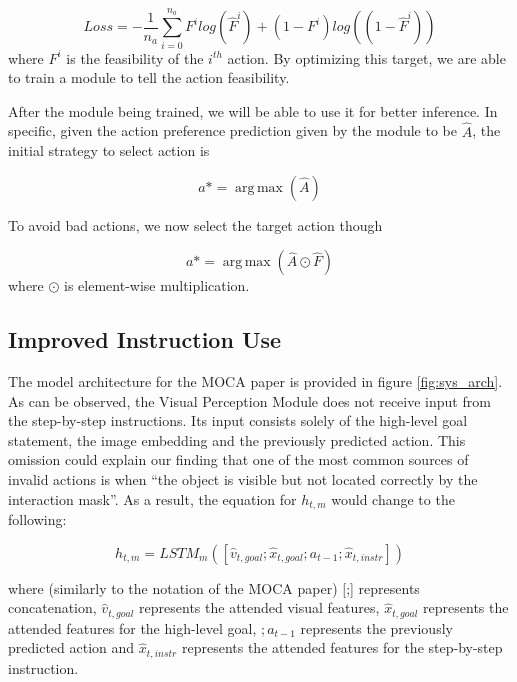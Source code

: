\documentclass[11pt,a4paper]{article}
\DeclareMathOperator*{\argmax}{arg\,max}
\begin{document}
\begin{equation}
    Loss = -\frac{1}{n_a} \sum^{n_a}_{i=0} F^i log (\hat{F}^i) + (1-F^i) log ((1-\hat{F}^i))
\end{equation}
where $F^i$ is the feasibility of the $i^{th}$ action. By optimizing this target, we are able to train a module to tell the action feasibility.

After the module being trained, we will be able to use it for better inference. In specific, given the action preference prediction given by the module to be $\hat{A}$, the initial strategy to select action is 

\begin{equation}
    a* = \argmax(\hat{A})  
\end{equation}

To avoid bad actions, we now select the target action though

\begin{equation}
    a* = \argmax(\hat{A}\odot\hat{F})
\end{equation}
where $\odot$ is element-wise multiplication.

\subsection{Improved Instruction Use}

The model architecture for the MOCA paper is provided in figure \ref{fig:sys_arch}. As can be observed, the Visual Perception Module does not receive input from the step-by-step instructions. Its input consists solely of the high-level goal statement, the image embedding and the previously predicted action. This omission could explain our finding that one of the most common sources of invalid actions is when ``the object is visible but not located correctly by the interaction mask''. As a result, the equation for $h_{t,m}$ would change to the following:

\begin{equation}

    h_{t,m} = LSTM_{m}([\hat{v}_{t,goal};\hat{x}_{t,goal};a_{t-1};\hat{x}_{t,instr}])

\end{equation}

where (similarly to the notation of the MOCA paper) [;] represents concatenation, $\hat{v}_{t,goal}$ represents the attended visual features, $\hat{x}_{t,goal}$ represents the attended features for the high-level goal, $;a_{t-1}$ represents the previously predicted action and $\hat{x}_{t,instr}$ represents the attended features for the step-by-step instruction. 
\end{document}
